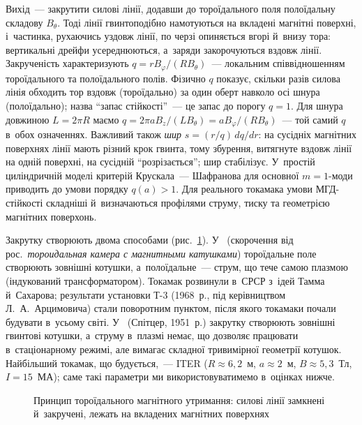 Вихід~--- закрутити силові лінії, додавши до тороїдального поля полоїдальну складову
$B_\theta$. Тоді лінії гвинтоподібно намотуються на вкладені магнітні поверхні,
і~частинка, рухаючись уздовж лінії, по черзі опиняється вгорі й~внизу тора: вертикальні
дрейфи усереднюються, а~заряди закорочуються вздовж лінії. Закрученість характеризують
 $q=rB_\varphi/(RB_\theta)$~--- локальним співвідношенням
тороїдального та полоїдального полів. Фізично $q$ показує, скільки разів силова лінія обходить тор вздовж (тороїдально) за один оберт навколо осі шнура (полоїдально);
назва \enquote{запас стійкості}~--- це запас до порогу $q=1$. Для шнура довжиною $L=2\pi R$ маємо $q=2\pi aB_z/(LB_\theta)=aB_\varphi/(RB_\theta)$~---
той самий $q$ в~обох означеннях. Важливий також \emph{шир} $s=(r/q)\,dq/dr$: на сусідніх магнітних поверхнях лінії мають різний крок гвинта,
тому збурення, витягнуте вздовж лінії на одній поверхні, на сусідній \enquote{розрізається}; шир стабілізує. У~простій циліндричній моделі критерій Крускала~---
Шафранова для основної $m=1$-моди приводить до умови порядку $q(a)>1$. Для реального
токамака умови МГД-стійкості складніші й~визначаються профілями струму, тиску та
геометрією магнітних поверхонь.

Закрутку створюють двома способами (рис.~\ref{pic:toroidal-trap}). У~
(скорочення від рос.~\emph{тороидальная камера с магнитными катушками}) тороїдальне поле
створюють зовнішні котушки, а~полоїдальне~--- струм, що тече самою плазмою (індукований
трансформатором). Токамак розвинули в~СРСР з~ідей Тамма й~Сахарова; результати установки
Т-3 (1968~р., під керівництвом Л.~А.~Арцимовича) стали поворотним пунктом, після якого
токамаки почали будувати в~усьому світі. У~ (Спітцер, 1951~р.) закрутку
створюють зовнішні гвинтові котушки, а~струму в~плазмі немає, що дозволяє працювати
в~стаціонарному режимі, але вимагає складної тривимірної геометрії котушок. Найбільший
токамак, що будується,~--- ITER ($R\approx6{,}2$~м, $a\approx2$~м, $B\approx5{,}3$~Тл,
$I=15$~МА); саме такі параметри ми використовуватимемо в~оцінках нижче.

\begin{figure}[ht]\centering
	\caption{Принцип тороїдального магнітного утримання: силові лінії замкнені
	й~закручені, лежать на вкладених магнітних поверхнях}
	\label{pic:toroidal-trap}
\end{figure}

